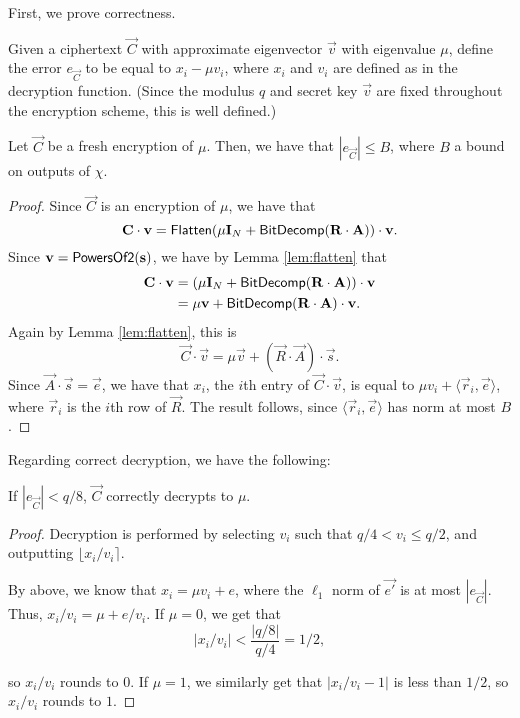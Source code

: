    First, we prove correctness.

    Given a ciphertext $\vec{C}$ with approximate eigenvector $\vec{v}$ with eigenvalue $\mu$, define the error $e_\vec{C}$ to be equal to $x_i - \mu v_i$, where $x_i$ and $v_i$ are defined as in the decryption function. (Since the modulus $q$ and secret key $\vec{v}$ are fixed throughout the encryption scheme, this is well defined.)

    \begin{lemma}
        Let $\vec{C}$ be a fresh encryption of $\mu$. Then, we have that $|e_\vec{C}| \leq B$, where $B$ a bound on outputs of $\chi$.
    \end{lemma}
    \begin{proof}
        Since $\vec{C}$ is an encryption of $\mu$, we have that
        \[\vec{C} \cdot \vec{v} = {\sf Flatten}(\mu \vec{I}_N + {\sf BitDecomp}(\vec{R} \cdot \vec{A})) \cdot \vec{v}.\]
        Since $\vec{v} = {\sf PowersOf2}(\vec{s})$, we have by Lemma \ref{lem:flatten} that
        \begin{align*}
            \vec{C} \cdot \vec{v} &= (\mu \vec{I}_N + {\sf BitDecomp}(\vec{R} \cdot \vec{A})) \cdot \vec{v} \\
            &= \mu \vec{v} + {\sf BitDecomp}(\vec{R} \cdot \vec{A}) \cdot \vec{v}.
        \end{align*}
        Again by Lemma \ref{lem:flatten}, this is
        \[\vec{C} \cdot \vec{v} = \mu \vec{v} + (\vec{R} \cdot \vec{A}) \cdot \vec{s}.\]
        Since $\vec{A} \cdot \vec{s} = \vec{e}$, we have that $x_i$, the $i$th entry of $\vec{C} \cdot \vec{v}$, is equal to $\mu v_i + \langle \vec{r}_i, \vec{e} \rangle$, where $\vec{r}_i$ is the $i$th row of $\vec{R}$. The result follows, since  $\langle \vec{r}_i, \vec{e} \rangle$ has norm at most $B$.
    \end{proof}

    Regarding correct decryption, we have the following:
    \begin{lemma}
        If $|e_\vec{C}| < q/8$, $\vec{C}$ correctly decrypts to $\mu$.
    \end{lemma}
    \begin{proof}
        Decryption is performed by selecting $v_i$ such that $q/4 < v_i \leq q/2$, and outputting $\lfloor x_i / v_i \rceil$.

        By above, we know that $x_i = \mu v_i + e$, where the $\ell_1$ norm of $\vec{e'}$ is at most $|e_\vec{C}|$. Thus, $x_i / v_i = \mu + e / v_i$. If $\mu = 0$, we get that
        \[|x_i / v_i| < \frac{|q/8|}{q/4} = 1/2,\]

        so $x_i / v_i$ rounds to $0$. If $\mu = 1$, we similarly get that $|x_i / v_i - 1|$ is less than $1/2$, so $x_i / v_i$ rounds to $1$.
    \end{proof}

